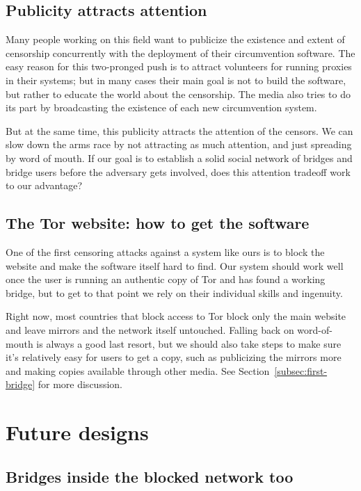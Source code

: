 \documentclass{llncs}
\begin{document}
\subsection{Publicity attracts attention}
\label{subsec:publicity}

Many people working on this field want to publicize the existence
and extent of censorship concurrently with the deployment of their
circumvention software. The easy reason for this two-pronged push is
to attract volunteers for running proxies in their systems; but in many
cases their main goal is not to build the software, but rather to educate
the world about the censorship. The media also tries to do its part by
broadcasting the existence of each new circumvention system.

But at the same time, this publicity attracts the attention of the
censors. We can slow down the arms race by not attracting as much
attention, and just spreading by word of mouth. If our goal is to
establish a solid social network of bridges and bridge users before
the adversary gets involved, does this attention tradeoff work to our
advantage?

\subsection{The Tor website: how to get the software}

One of the first censoring attacks against a system like ours is to
block the website and make the software itself hard to find. Our system
should work well once the user is running an authentic
copy of Tor and has found a working bridge, but to get to that point
we rely on their individual skills and ingenuity.

Right now, most countries that block access to Tor block only the main
website and leave mirrors and the network itself untouched.
Falling back on word-of-mouth is always a good last resort, but we should
also take steps to make sure it's relatively easy for users to get a copy,
such as publicizing the mirrors more and making copies available through
other media.
See Section~\ref{subsec:first-bridge} for more discussion.

\section{Future designs}

\subsection{Bridges inside the blocked network too}
\end{document}
